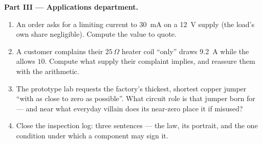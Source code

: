 \begin{problem}
\medskip\noindent\textbf{Part III --- Applications
department.}
\begin{enumerate}[resume]
  \item An order asks for a  limiting current to
        \qty{30}{mA} on a \qty{12}{V} supply (the load's own
        share negligible). Compute the value to quote.
  \item A customer complains their $25\,\Omega$ heater coil
        ``only'' draws \qty{9.2}{A} while the  allows
        $10$. Compute what supply  their complaint
        implies, and reassure them with the arithmetic.
  \item The prototype lab requests the factory's thickest,
        shortest copper jumper ``with as close to zero 
        as possible''. What circuit role is that jumper born
        for --- and near what everyday villain does its
        near-zero  place it if misused?
  \item Close the inspection log: three sentences --- the
        law, its portrait, and the one condition under which
        a component may sign it.
\end{enumerate}
\end{problem}
